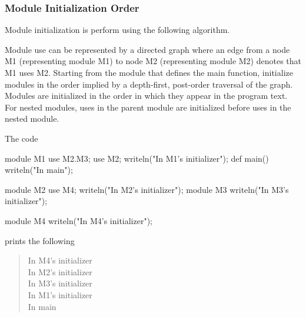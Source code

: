 \subsubsection{Module Initialization Order}
\label{Module_Initialization_Order}

Module initialization is perform using the following algorithm.

Module use can be represented by a directed graph where an edge from a
node M1 (representing module M1) to node M2 (representing module M2)
denotes that M1 uses M2.  Starting from the module that defines the
main function, initialize modules in the order implied by a
depth-first, post-order traversal of the graph.  Modules are
initialized in the order in which they appear in the program text.
For nested modules, uses in the parent module are initialized before
uses in the nested module.

\begin{example}
The code
\begin{chapelcode}
module M1 {
  use M2.M3;
  use M2;
  writeln("In M1's initializer");
  def main() {
    writeln("In main");
  }
}

module M2 {
  use M4;
  writeln("In M2's initializer");
  module M3 {
    writeln("In M3's initializer");
  }
}

module M4 {
  writeln("In M4's initializer");
}
\end{chapelcode}
prints the following
\begin{quote}
In M4's initializer\\
In M2's initializer\\
In M3's initializer\\
In M1's initializer\\
In main
\end{quote}
\end{example}
